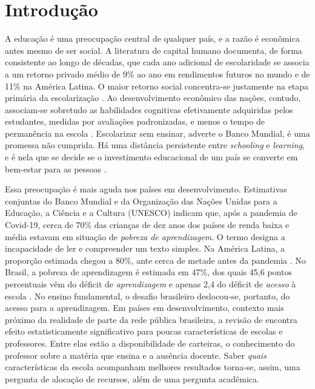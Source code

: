 \chapter{Introdução}

A educação é uma preocupação central de qualquer país, e a razão é
econômica antes mesmo de ser social. A literatura de capital humano
documenta, de forma consistente ao longo de décadas, que cada ano adicional
de escolaridade se associa a um retorno privado médio de 9\% ao ano em
rendimentos futuros no mundo e de 11\% na América Latina. O maior retorno
social concentra-se justamente na etapa primária da escolarização
\cite{psacharopoulos2018returns}. Ao desenvolvimento econômico das nações,
contudo, associam-se sobretudo as habilidades cognitivas efetivamente
adquiridas pelos estudantes, medidas por avaliações padronizadas, e menos o
tempo de permanência na escola \cite{hanushek2008role}. Escolarizar sem
ensinar, adverte o Banco Mundial, é uma promessa não cumprida. Há uma
distância persistente entre \emph{schooling} e \emph{learning}, e é nela que
se decide se o investimento educacional de um país se converte em
bem-estar para as pessoas \cite{worldbank2018wdr}.

Essa preocupação é mais aguda nos países em desenvolvimento. Estimativas
conjuntas do Banco Mundial e da Organização das Nações Unidas para a
Educação, a Ciência e a Cultura (UNESCO) indicam que, após a pandemia de
Covid-19, cerca de 70\% das crianças de dez anos dos países de renda baixa
e média estavam em situação de \emph{pobreza de aprendizagem}. O termo
designa a incapacidade de ler e compreender um texto simples. Na América
Latina, a proporção estimada chegou a 80\%, ante cerca de metade antes da
pandemia \cite{worldbank2022learningpoverty}. No Brasil, a pobreza de
aprendizagem é estimada em 47\%, dos quais 45,6 pontos percentuais vêm do
déficit de \emph{aprendizagem} e apenas 2,4 do déficit de \emph{acesso} à
escola \cite{worldbank2024brazilbrief}. No ensino fundamental, o desafio
brasileiro deslocou-se, portanto, do acesso para a aprendizagem. Em países
em desenvolvimento, contexto mais próximo da realidade de parte da rede
pública brasileira, a revisão de  encontra
efeito estatisticamente significativo para poucas características de
escolas e professores. Entre elas estão a disponibilidade de carteiras, o
conhecimento do professor sobre a matéria que ensina e a ausência docente.
Saber \emph{quais} características da escola acompanham melhores resultados
torna-se, assim, uma pergunta de alocação de recursos, além de uma
pergunta acadêmica.

